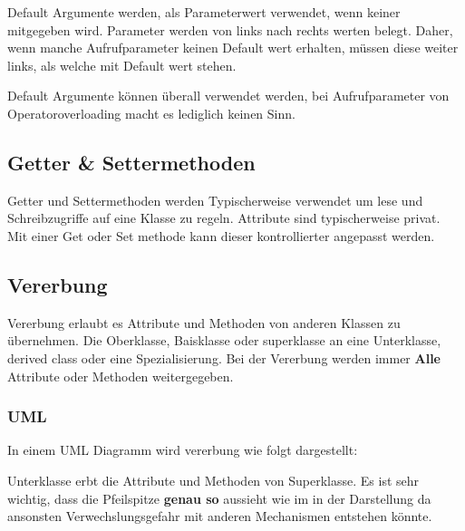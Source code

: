 Default Argumente werden, als Parameterwert verwendet, wenn keiner mitgegeben wird.
Parameter werden von links nach rechts werten belegt. 
Daher, wenn manche Aufrufparameter keinen Default wert erhalten, müssen diese weiter links, als welche mit Default wert stehen.  



Default Argumente können überall verwendet werden, bei Aufrufparameter von Operatoroverloading macht es lediglich keinen Sinn.

\subsection{Getter \& Settermethoden}

Getter und Settermethoden werden Typischerweise verwendet um lese und Schreibzugriffe auf eine Klasse zu regeln. 
Attribute sind typischerweise privat. 
Mit einer Get oder Set methode kann dieser kontrollierter angepasst  werden.\\



\subsection{Vererbung}

Vererbung erlaubt es Attribute und Methoden von anderen Klassen zu übernehmen. 
Die Oberklasse, Baisklasse oder superklasse  an eine Unterklasse, derived class oder eine Spezialisierung. 
Bei der Vererbung werden immer \textbf{Alle} Attribute oder Methoden weitergegeben.  


\subsubsection{UML}

In einem UML Diagramm wird vererbung wie folgt dargestellt:\\

\begin{center}
\end{center}


Unterklasse erbt die Attribute und Methoden von Superklasse.
Es ist sehr wichtig, dass die Pfeilspitze \textbf{genau so} aussieht wie im in der Darstellung da ansonsten Verwechslungsgefahr mit anderen Mechanismen entstehen könnte.

